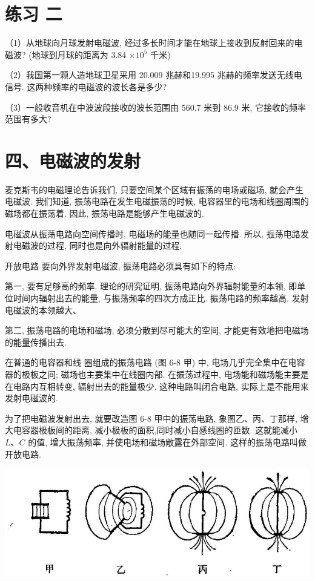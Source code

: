 \documentclass[10pt]{article}
\begin{document}
\section*{练习 二}

（1）从地球向月球发射电磁波, 经过多长时间才能在地球上接收到反射回来的电磁波? (地球到月球的距离为 3.84 \(\times {10}^{5}\) 千米)

（2）我国第一颗人造地球卫星采用 20.009 兆赫和19.995 兆赫的频率发送无线电信号. 这两种频率的电磁波的波长各是多少?

（3）一般收音机在中波波段接收的波长范围由 560.7 米到 86.9 米, 它接收的频率范围有多大?

\section*{四、电磁波的发射}

麦克斯韦的电磁理论告诉我们, 只要空间某个区域有振荡的电场或磁场, 就会产生电磁波. 我们知道, 振荡电路在发生电磁振荡的时候, 电容器里的电场和线圈周围的磁场都在振荡着. 因此, 振荡电路是能够产生电磁波的.

电磁波从振荡电路向空间传播时, 电磁场的能量也随同一起传播. 所以, 振荡电路发射电磁波的过程, 同时也是向外辐射能量的过程.

开放电路 要向外界发射电磁波, 振荡电路必须具有如下的特点:

第一, 要有足够高的频率. 理论的研究证明, 振荡电路向外界辐射能量的本领, 即单位时间内辐射出去的能量, 与振荡频率的四次方成正比. 振荡电路的频率越高, 发射电磁波的本领越大、

第二, 振荡电路的电场和磁场, 必须分散到尽可能大的空间, 才能更有效地把电磁场的能量传播出去.

在普通的电容器和线 圈组成的振荡电路 (图 6-8 甲) 中, 电场几乎完全集中在电容器的极板之间; 磁场也主要集中在线圈内部. 在振荡过程中, 电场能和磁场能主要是在电路内互相转变, 辐射出去的能量极少. 这种电路叫闭合电路, 实际上是不能用来发射电磁波的.

为了把电磁波发射出去, 就要改造图 6-8 甲中的振荡电路, 象图乙、丙、丁那样, 增大电容器极板间的距离, 减小极板的面积,同时减小自感线圈的匝数. 这就能减小 \(L\text{、}C\) 的值, 增大振荡频率, 并使电场和磁场敞露在外部空间. 这样的振荡电路叫做开放电路.

\begin{center}
\includegraphics[max width=1.0\textwidth]{images/01913056-1f15-74d8-9184-9aab52c9d66b_203_662876.jpg}
\end{center}
\end{document}
